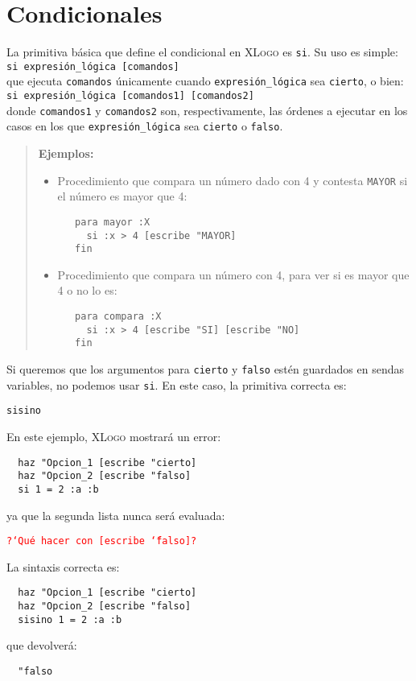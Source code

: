 \chapter{Condicionales}
   \label{Condicionales}

La primitiva b\'asica que define el condicional en \textsc{XLogo} es \texttt{si}.
Su uso es simple: \\

\texttt{si expresi\'on\_l\'ogica [comandos]} \\

\noindent que ejecuta \texttt{comandos} \'unicamente cuando
\texttt{expresi\'on\_l\'ogica} sea \texttt{cierto}, o bien: \\

\texttt{si expresi\'on\_l\'ogica [comandos1] [comandos2]} \\

\noindent donde \texttt{comandos1} y \texttt{comandos2} son, respectivamente,
las \'ordenes a ejecutar en los casos en los que \texttt{expresi\'on\_l\'ogica}
sea \texttt{cierto} o \texttt{falso}.

\begin{quote}
\noindent \textbf{Ejemplos: }
\begin{itemize}
   \item Procedimiento que compara un n\'umero dado con 4 y contesta
      \texttt{MAYOR} si el n\'umero es mayor que 4: 
      \begin{verbatim}
   para mayor :X
     si :x > 4 [escribe "MAYOR]
   fin \end{verbatim}
   \item Procedimiento que compara un n\'umero con 4, para ver si es
      mayor que 4 o no lo es: 
      \begin{verbatim}
   para compara :X
     si :x > 4 [escribe "SI] [escribe "NO]
   fin \end{verbatim}
\end{itemize}
\end{quote}

Si queremos que los argumentos para \texttt{cierto} y \texttt{falso} est\'en
guardados en sendas variables, no podemos usar \texttt{si}. En este caso, la
primitiva correcta es:
\begin{center}
   \texttt{sisino}
\end{center}
En este ejemplo, \textsc{XLogo} mostrar\'a un error:
\begin{verbatim}
  haz "Opcion_1 [escribe "cierto]
  haz "Opcion_2 [escribe "falso]
  si 1 = 2 :a :b\end{verbatim}
ya que la segunda lista nunca ser\'a evaluada:

\noindent\textcolor{red}{\texttt{?`Qu\'e hacer con [escribe \char`\"{}falso]?}}

La sintaxis correcta es:
\begin{verbatim}
  haz "Opcion_1 [escribe "cierto]
  haz "Opcion_2 [escribe "falso]
  sisino 1 = 2 :a :b\end{verbatim}
que devolver\'a:
\begin{verbatim}
  "falso\end{verbatim}
